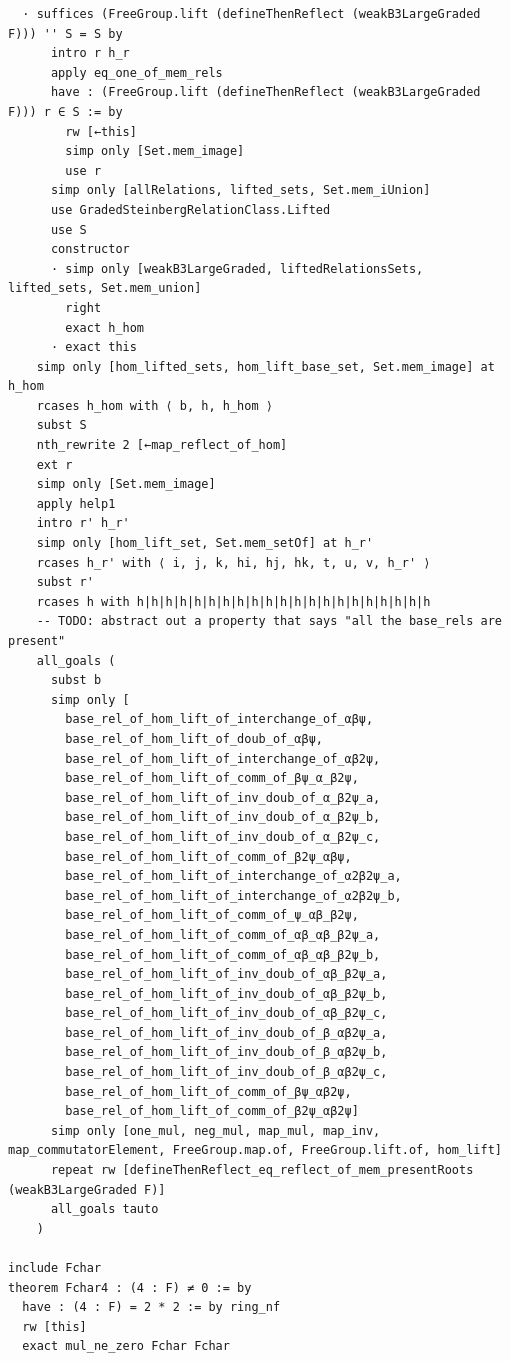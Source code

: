 \documentclass[10pt,a4paper]{article}
\begin{document}
\begin{Verbatim}
  · suffices (FreeGroup.lift (defineThenReflect (weakB3LargeGraded F))) '' S = S by
      intro r h_r
      apply eq_one_of_mem_rels
      have : (FreeGroup.lift (defineThenReflect (weakB3LargeGraded F))) r ∈ S := by
        rw [←this]
        simp only [Set.mem_image]
        use r
      simp only [allRelations, lifted_sets, Set.mem_iUnion]
      use GradedSteinbergRelationClass.Lifted
      use S
      constructor
      · simp only [weakB3LargeGraded, liftedRelationsSets, lifted_sets, Set.mem_union]
        right
        exact h_hom
      · exact this
    simp only [hom_lifted_sets, hom_lift_base_set, Set.mem_image] at h_hom
    rcases h_hom with ⟨ b, h, h_hom ⟩
    subst S
    nth_rewrite 2 [←map_reflect_of_hom]
    ext r
    simp only [Set.mem_image]
    apply help1
    intro r' h_r'
    simp only [hom_lift_set, Set.mem_setOf] at h_r'
    rcases h_r' with ⟨ i, j, k, hi, hj, hk, t, u, v, h_r' ⟩
    subst r'
    rcases h with h|h|h|h|h|h|h|h|h|h|h|h|h|h|h|h|h|h|h|h|h
    -- TODO: abstract out a property that says "all the base_rels are present"
    all_goals (
      subst b
      simp only [
        base_rel_of_hom_lift_of_interchange_of_αβψ,
        base_rel_of_hom_lift_of_doub_of_αβψ,
        base_rel_of_hom_lift_of_interchange_of_αβ2ψ,
        base_rel_of_hom_lift_of_comm_of_βψ_α_β2ψ,
        base_rel_of_hom_lift_of_inv_doub_of_α_β2ψ_a,
        base_rel_of_hom_lift_of_inv_doub_of_α_β2ψ_b,
        base_rel_of_hom_lift_of_inv_doub_of_α_β2ψ_c,
        base_rel_of_hom_lift_of_comm_of_β2ψ_αβψ,
        base_rel_of_hom_lift_of_interchange_of_α2β2ψ_a,
        base_rel_of_hom_lift_of_interchange_of_α2β2ψ_b,
        base_rel_of_hom_lift_of_comm_of_ψ_αβ_β2ψ,
        base_rel_of_hom_lift_of_comm_of_αβ_αβ_β2ψ_a,
        base_rel_of_hom_lift_of_comm_of_αβ_αβ_β2ψ_b,
        base_rel_of_hom_lift_of_inv_doub_of_αβ_β2ψ_a,
        base_rel_of_hom_lift_of_inv_doub_of_αβ_β2ψ_b,
        base_rel_of_hom_lift_of_inv_doub_of_αβ_β2ψ_c,
        base_rel_of_hom_lift_of_inv_doub_of_β_αβ2ψ_a,
        base_rel_of_hom_lift_of_inv_doub_of_β_αβ2ψ_b,
        base_rel_of_hom_lift_of_inv_doub_of_β_αβ2ψ_c,
        base_rel_of_hom_lift_of_comm_of_βψ_αβ2ψ,
        base_rel_of_hom_lift_of_comm_of_β2ψ_αβ2ψ]
      simp only [one_mul, neg_mul, map_mul, map_inv, map_commutatorElement, FreeGroup.map.of, FreeGroup.lift.of, hom_lift]
      repeat rw [defineThenReflect_eq_reflect_of_mem_presentRoots (weakB3LargeGraded F)]
      all_goals tauto
    )

include Fchar
theorem Fchar4 : (4 : F) ≠ 0 := by
  have : (4 : F) = 2 * 2 := by ring_nf
  rw [this]
  exact mul_ne_zero Fchar Fchar


\end{Verbatim}
\end{document}
